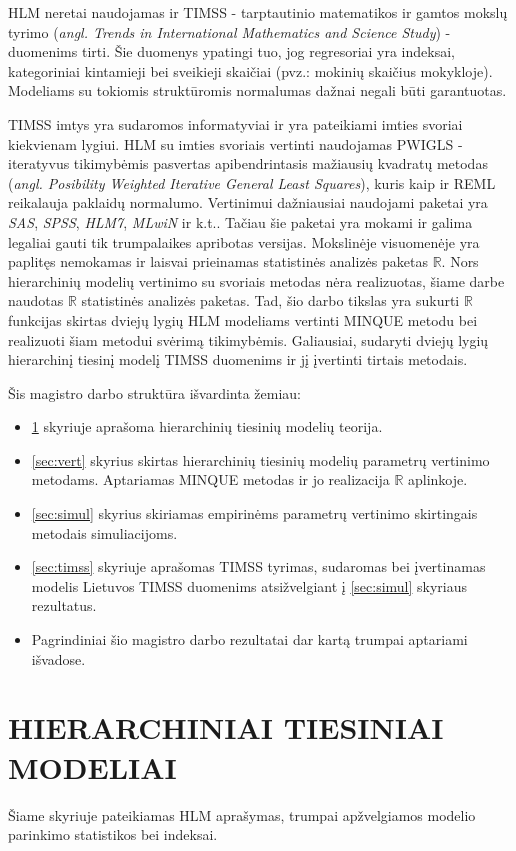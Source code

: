 \documentclass[12pt,a4paper]{article}
\newcommand{\R}{{\mathbb R}}
\begin{document}
\indent HLM neretai naudojamas ir TIMSS - tarptautinio matematikos ir gamtos mokslų tyrimo (\textit{angl. Trends in International Mathematics and Science Study}) - duomenims tirti. Šie duomenys ypatingi tuo, jog regresoriai yra indeksai, kategoriniai kintamieji bei sveikieji skaičiai (pvz.: mokinių skaičius mokykloje). Modeliams su tokiomis struktūromis normalumas dažnai negali būti garantuotas. 

\indent TIMSS imtys yra sudaromos informatyviai ir yra pateikiami imties svoriai kiekvienam lygiui. HLM su imties svoriais vertinti naudojamas PWIGLS - iteratyvus tikimybėmis pasvertas apibendrintasis mažiausių kvadratų metodas (\textit{angl. Posibility Weighted Iterative General Least Squares}), kuris kaip ir REML reikalauja paklaidų normalumo. Vertinimui dažniausiai naudojami paketai yra \textit{SAS}, \textit{SPSS}, \textit{HLM7}, \textit{MLwiN} ir k.t.. Tačiau šie paketai yra mokami ir galima legaliai gauti tik trumpalaikes apribotas versijas. Mokslinėje visuomenėje yra paplitęs nemokamas ir laisvai prieinamas statistinės analizės paketas $\R$. Nors hierarchinių modelių vertinimo su svoriais metodas nėra realizuotas, šiame darbe naudotas $\R$ statistinės analizės paketas. Tad, šio darbo tikslas yra sukurti $\R$ funkcijas skirtas dviejų lygių HLM modeliams vertinti MINQUE metodu bei realizuoti šiam metodui svėrimą tikimybėmis. Galiausiai, sudaryti dviejų lygių hierarchinį tiesinį modelį TIMSS duomenims ir jį įvertinti tirtais metodais.


\indent Šis magistro darbo struktūra išvardinta žemiau:
\begin{itemize}
\item \ref{sec:hlm} skyriuje aprašoma hierarchinių tiesinių modelių teorija.
\item \ref{sec:vert} skyrius skirtas hierarchinių tiesinių modelių parametrų vertinimo metodams. Aptariamas MINQUE metodas ir jo realizacija $\R$ aplinkoje.
\item \ref{sec:simul} skyrius skiriamas empirinėms parametrų vertinimo skirtingais metodais simuliacijoms.
\item \ref{sec:timss} skyriuje aprašomas TIMSS tyrimas, sudaromas bei įvertinamas modelis Lietuvos TIMSS duomenims atsižvelgiant į \ref{sec:simul} skyriaus rezultatus.
\item Pagrindiniai šio magistro darbo rezultatai dar kartą trumpai aptariami išvadose.
\end{itemize}

\newpage
\section{HIERARCHINIAI TIESINIAI MODELIAI} \label{sec:hlm}
\indent Šiame skyriuje pateikiamas HLM aprašymas, trumpai apžvelgiamos modelio parinkimo statistikos bei indeksai.
\end{document}

